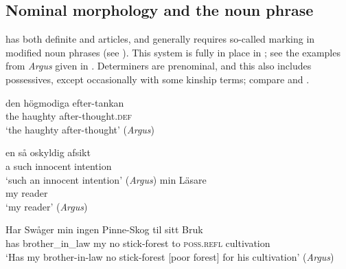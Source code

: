 \documentclass[output=paper]{langscibook}
\begin{document}
\subsection{Nominal morphology and the noun phrase}\label{sec:intro:3.4}


 has both definite and  articles, and generally requires so-called  marking in modified noun phrases (see \citealt{Julien2005}). This system is fully in place in ; see the examples from \textit{Argus} given in . Determiners are prenominal, and this also includes possessives, except occasionally with some kinship terms; compare  and .


\ea \label{ex:intro:33}
\ea \label{ex:intro:33a}
\gll  den högmodiga     efter-tankan \\
the  haughty   after-thought\textsc{.def}\\
\glt ‘the haughty after-thought’ (\textit{Argus})

\ex \label{ex:intro:33b}
\gll en så     oskyldig   afsikt\\
    a   such  innocent   intention\\
\glt `such an innocent intention’ (\textit{Argus})
\z
\ex \label{ex:intro:34}
\ea \label{ex:intro:34a}
\gll  min Läsare \\
my   reader \\
\glt        ‘my reader’ (\textit{Argus})

\ex \label{ex:intro:34b}
\gll Har Swåger       min   ingen Pinne-Skog   til sitt       Bruk\\
 has  brother\_in\_law  my  no    stick-forest    to  \textsc{poss.refl}  cultivation\\
\glt        ‘Has my brother-in-law no stick-forest [poor forest] for his cultivation’ (\textit{Argus})
\z
\z
\end{document}
